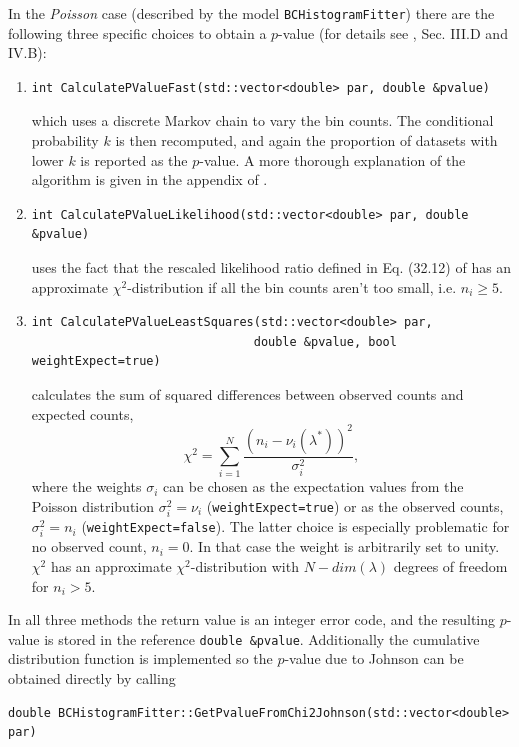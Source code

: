 \documentclass[11pt, a4paper]{article}
\begin{document}
\noindent
In the \textit{Poisson} case (described by the model \verb|BCHistogramFitter|)
there are the following three
specific choices to obtain a $p$-value
(for details see \cite{BAT_pValue}, Sec. III.D and IV.B):
\begin{enumerate}
 \item
\begin{verbatim}
int CalculatePValueFast(std::vector<double> par, double &pvalue)
\end{verbatim}
which uses a discrete Markov chain to vary the bin counts.
The conditional probability $k$ is then recomputed, and
again the proportion of datasets with lower $k$ is
reported as the $p$-value. A more thorough explanation
of the algorithm is given
in the appendix of \cite{BAT_pValue}.
\item
\begin{verbatim}
int CalculatePValueLikelihood(std::vector<double> par, double &pvalue)
\end{verbatim}
uses the fact that the rescaled likelihood ratio defined in
Eq. (32.12) of \cite{PDGstatistics} has an approximate
$\chi^2$-distribution if all the bin counts aren't too small,
i.e. $n_i \ge 5$.

\item
\begin{verbatim}
int CalculatePValueLeastSquares(std::vector<double> par,
                               double &pvalue, bool weightExpect=true)
\end{verbatim}
calculates the sum of squared differences between observed counts and
expected counts, $$\chi^2 = \sum_{i=1}^N \frac{\left(n_i -
\nu_i(\lambda^{*})\right)^2}{\sigma_i^2},$$ where the weights
$\sigma_i$ can be chosen as the expectation values from the Poisson
distribution $\sigma_i^2 = \nu_i$ (\verb|weightExpect=true|) or as the
observed counts, $\sigma_i^2 = n_i$ (\verb|weightExpect=false|).  The
latter choice is especially problematic for no observed count, $n_i
=0$. In that case the weight is arbitrarily set to unity.  $\chi^2$
has an approximate $\chi^2$-distribution with $N-dim(\lambda)$ degrees
of freedom for $n_i>5$.
\end{enumerate}
In all three methods the return value is an integer error code, and
the resulting $p$-value is stored in the reference
\verb|double &pvalue|.  Additionally the cumulative distribution
function is implemented so the $p$-value due to Johnson
\cite{Johnson_pValue} can be obtained directly by calling
\begin{verbatim}
double BCHistogramFitter::GetPvalueFromChi2Johnson(std::vector<double> par)
\end{verbatim}
\end{document}
